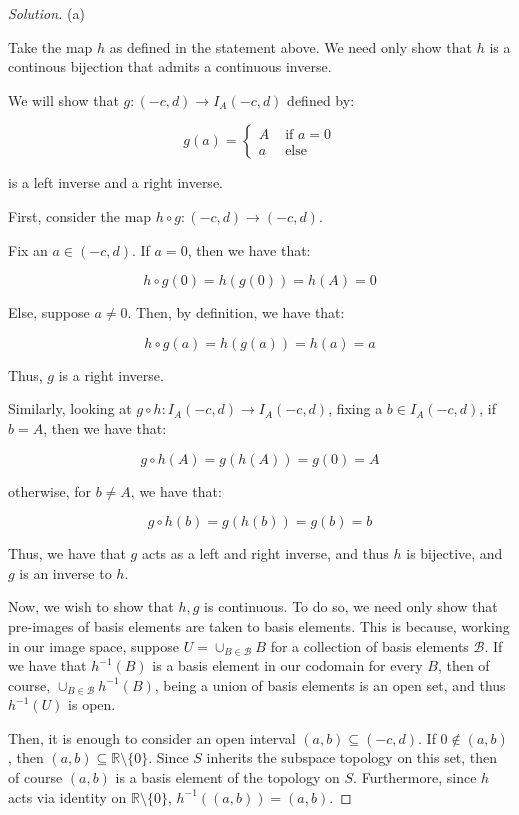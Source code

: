 \documentclass[10pt]{article}
\begin{document}
\begin{proof}[Solution]

(a)

Take the map $h$ as defined in the statement above. We need only show that $h$ is a continous bijection that admits a continuous inverse.

We will show that $g: (-c,d) \to I_A(-c,d)$ defined by:

$$g(a) = \begin{cases} A & \text{ if } a= 0 \\ a & \text{ else } \end{cases}$$

is a left inverse and a right inverse.

First, consider the map $h \circ g: (-c,d) \to (-c,d)$.

Fix an $ a \in (-c,d)$. If $a = 0$, then we have that:

$$h \circ g(0) = h(g(0)) = h(A) = 0$$

Else, suppose $a \not = 0$. Then, by definition, we have that:

$$h \circ g(a) = h(g(a)) = h(a) = a$$

Thus, $g$ is a right inverse.

Similarly, looking at $g\circ h: I_A(-c,d) \to I_A(-c,d)$, fixing a $b \in I_A(-c,d)$, if $b = A$, then we have that:

$$ g \circ h(A) = g(h(A)) = g(0) = A$$

otherwise, for $b \not = A$, we have that:

$$ g \circ h(b) = g(h(b)) = g(b) = b $$

Thus, we have that $g$ acts as a left and right inverse, and thus $h$ is bijective, and $g$ is an inverse to $h$.

Now, we wish to show that $h, g$ is continuous. To do so, we need only show that pre-images of basis elements are taken to basis elements. This is because, working in our image space, suppose $U = \cup_{B \in \mathcal{B}} B$ for a collection of basis elements $\mathcal{B}$. If we have that $h^{-1}(B)$ is a basis element in our codomain for every $B$, then of course, $\cup_{B \in \mathcal{B}} h^{-1}(B)$, being a union of basis elements is an open set, and thus $h^{-1}(U)$ is open.

Then, it is enough to consider an open interval $(a,b) \subseteq (-c,d)$. If $0 \not \in (a,b)$, then $(a,b) \subseteq \mathbb{R} \setminus \{ 0 \}$. Since $S$ inherits the subspace topology on this set, then of course $(a,b)$ is a basis element of the topology on $S$. Furthermore, since $h$ acts via identity on $\mathbb{R} \setminus \{ 0 \}$, $h^{-1}((a,b)) = (a,b)$.


\end{proof}
\end{document}
